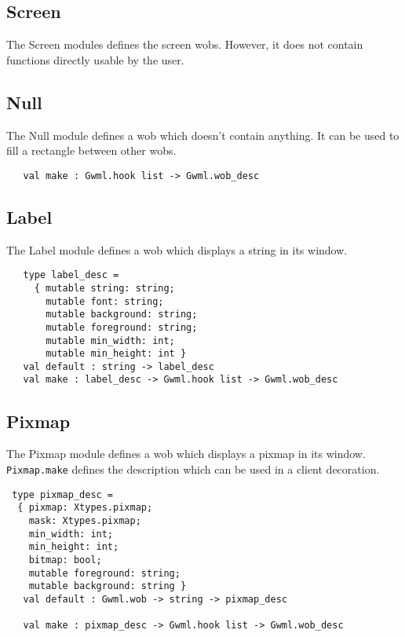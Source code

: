 \documentclass{book}
\begin{document}
\subsection{\bf Screen}

   The Screen modules defines the screen wobs. However, it does not 
contain functions directly usable by the user.

   \subsection{\bf Null}

  The Null module defines a wob which doesn't contain anything. It can be used
to fill a rectangle between other wobs.

\begin{verbatim}
   val make : Gwml.hook list -> Gwml.wob_desc
\end{verbatim}

   \subsection{\bf Label}

  The Label module defines a wob which displays a string in its window.
\begin{verbatim}
   type label_desc =
     { mutable string: string;
       mutable font: string;
       mutable background: string;
       mutable foreground: string;
       mutable min_width: int;
       mutable min_height: int }
   val default : string -> label_desc
   val make : label_desc -> Gwml.hook list -> Gwml.wob_desc
\end{verbatim}

   \subsection{\bf Pixmap}

  The Pixmap module defines a wob which displays a pixmap in its window.
{\tt Pixmap.make} defines the description which can be used in a client
decoration.

\begin{verbatim}
 type pixmap_desc =
  { pixmap: Xtypes.pixmap;
    mask: Xtypes.pixmap;
    min_width: int;
    min_height: int;
    bitmap: bool;
    mutable foreground: string;
    mutable background: string }
   val default : Gwml.wob -> string -> pixmap_desc

   val make : pixmap_desc -> Gwml.hook list -> Gwml.wob_desc
\end{verbatim}
\end{document}
